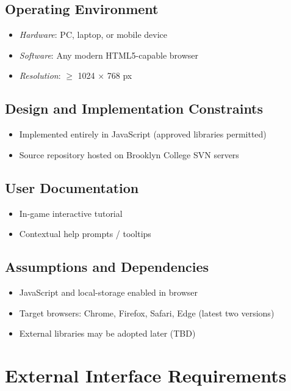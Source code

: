 \documentclass[11pt]{scrreprt}
\begin{document}
\section{Operating Environment}
\begin{itemize}
  \item \emph{Hardware}: PC, laptop, or mobile device
  \item \emph{Software}: Any modern HTML5-capable browser
  \item \emph{Resolution}: $\geq$ 1024 × 768 px
\end{itemize}

\section{Design and Implementation Constraints}
\begin{itemize}
  \item Implemented entirely in JavaScript (approved libraries permitted)
  \item Source repository hosted on Brooklyn College SVN servers
\end{itemize}

\section{User Documentation}
\begin{itemize}
  \item In-game interactive tutorial
  \item Contextual help prompts / tooltips
\end{itemize}

\section{Assumptions and Dependencies}
\begin{itemize}
  \item JavaScript and local-storage enabled in browser
  \item Target browsers: Chrome, Firefox, Safari, Edge (latest two versions)
  \item External libraries may be adopted later (TBD)
\end{itemize}

\chapter{External Interface Requirements}
\end{document}
